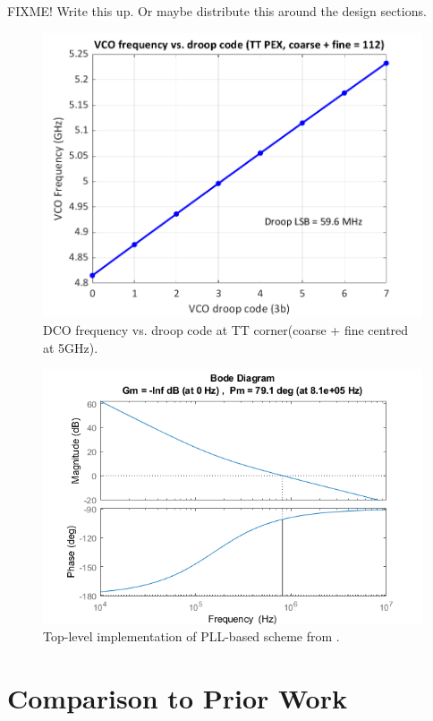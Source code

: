 \documentclass[twoside,9pt,journal,letterpage]{IEEEtran}
\begin{document}
FIXME! Write this up. 
Or maybe distribute this around the design sections. 

\begin{figure}[h]
	\centering
	\includegraphics[width=0.7\columnwidth]{fig_dco_droopctrl}
	\caption{DCO frequency vs. droop code at TT corner(coarse + fine centred at 5GHz).}
	\label{fig:dco_droopctrl}
\end{figure}

\begin{figure}[h]
	\centering
	\includegraphics[width=0.9\columnwidth]{fig_phasemargin}
	\caption{Top-level implementation of PLL-based scheme from \cite{hashimoto2018}.}
	\label{fig:phase_margin}
\end{figure}

% 	

\section{Comparison to Prior Work}
\label{sec:comp-priors}
\end{document}
